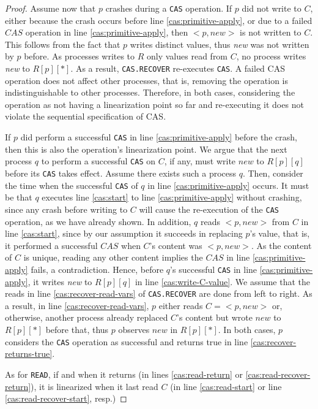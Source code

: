 \begin{proof}
	Assume now that $p$ crashes during a \texttt{CAS} operation.
	If $p$ did not write to $C$, either because the crash occurs before line \ref{cas:primitive-apply}, or due to a failed $CAS$ operation in line \ref{cas:primitive-apply}, then ${<}p,new{>}$ is not written to $C$. This follows from the fact that $p$ writes distinct values, thus \emph{new} was not written by $p$ before. As processes writes to $R$ only values read from $C$, no process writes \emph{new} to $R[p][*]$. As a result, \texttt{CAS.RECOVER} re-executes \texttt{CAS}. A failed CAS operation does not affect other processes, that is, removing the operation is indistinguishable to other processes. Therefore, in both cases, considering the operation as not having a linearization point so far and re-executing it does not violate the sequential specification of CAS.
	
	If $p$ did perform a successful \texttt{CAS} in line \ref{cas:primitive-apply} before the crash, then this is also the operation's linearization point. We argue that the next process $q$ to perform a successful \texttt{CAS} on $C$, if any, must write $new$ to $R[p][q]$ before its \texttt{CAS} takes effect. Assume there exists such a process $q$. Then, consider the time when the successful \texttt{CAS} of $q$ in line \ref{cas:primitive-apply} occurs. It must be that $q$ executes line \ref{cas:start} to line \ref{cas:primitive-apply} without crashing, since any crash before writing to $C$ will cause the re-execution of the \texttt{CAS} operation, as we have already shown. In addition, $q$ reads ${<}p,new{>}$ from $C$ in line \ref{cas:start}, since by our assumption it succeeds in replacing $p$'s value, that is, it performed a successful $CAS$ when $C$'s content was ${<}p,new{>}$. As the content of $C$ is unique, reading any other content implies the $CAS$ in line \ref{cas:primitive-apply} fails, a contradiction. Hence, before $q$'s successful \texttt{CAS} in line \ref{cas:primitive-apply}, it writes \emph{new} to $R[p][q]$ in line \ref{cas:write-C-value}.
	We assume that the reads in line \ref{cas:recover-read-vars} of \texttt{CAS.RECOVER} are done from left to right. As a result, in line \ref{cas:recover-read-vars}, $p$ either reads $C={<}p,new{>}$ or, otherwise, another process already replaced $C$'s content but wrote $new$ to $R[p][*]$ before that, thus $p$ observes $new$ in $R[p][*]$. In both cases, $p$ considers the \texttt{CAS} operation as successful and returns true in line \ref{cas:recover-returns-true}.
	
	As for \texttt{READ}, if and when it returns (in lines \ref{cas:read-return} or \ref{cas:read-recover-return}), it is linearized when it last read $C$ (in line \ref{cas:read-start} or line \ref{cas:read-recover-start}, resp.)
	
\end{proof}



